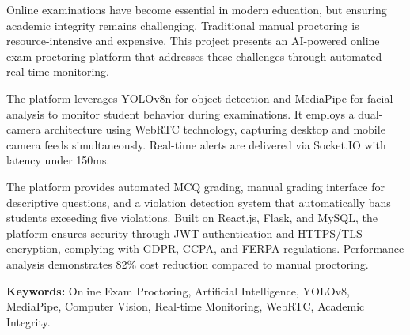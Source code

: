 Online examinations have become essential in modern education, but ensuring academic integrity remains challenging. Traditional manual proctoring is resource-intensive and expensive. This project presents an AI-powered online exam proctoring platform that addresses these challenges through automated real-time monitoring.

The platform leverages YOLOv8n for object detection and MediaPipe for facial analysis to monitor student behavior during examinations. It employs a dual-camera architecture using WebRTC technology, capturing desktop and mobile camera feeds simultaneously. Real-time alerts are delivered via Socket.IO with latency under 150ms.

The platform provides automated MCQ grading, manual grading interface for descriptive questions, and a violation detection system that automatically bans students exceeding five violations. Built on React.js, Flask, and MySQL, the platform ensures security through JWT authentication and HTTPS/TLS encryption, complying with GDPR, CCPA, and FERPA regulations. Performance analysis demonstrates 82\% cost reduction compared to manual proctoring.

\vspace{8pt}
\textbf{Keywords:} Online Exam Proctoring, Artificial Intelligence, YOLOv8, MediaPipe, Computer Vision, Real-time Monitoring, WebRTC, Academic Integrity.
